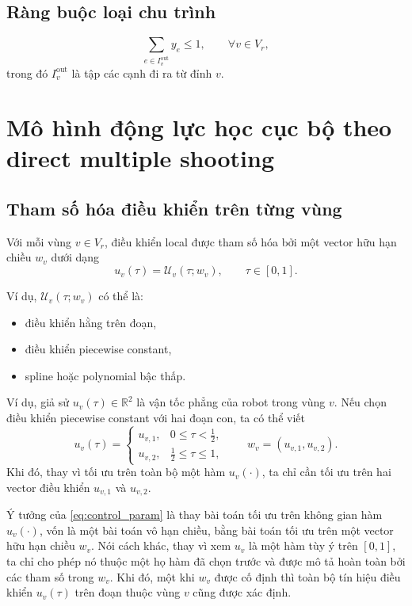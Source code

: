 \documentclass[12pt]{article}
\begin{document}
\subsection{Ràng buộc loại chu trình}

\begin{equation}
\sum_{e\in I_v^{\mathrm{out}}} y_e \le 1,
\qquad \forall v\in V_r,
\label{eq:acyclicity}
\end{equation}
trong đó $I_v^{\mathrm{out}}$ là tập các cạnh đi ra từ đỉnh $v$.

\section{Mô hình động lực học cục bộ theo direct multiple shooting}

\subsection{Tham số hóa điều khiển trên từng vùng}

Với mỗi vùng $v\in V_r$, điều khiển local được tham số hóa bởi một vector hữu hạn chiều $w_v$ dưới dạng
\begin{equation}
u_v(\tau)=\mathcal U_v(\tau;w_v),
\qquad \tau\in[0,1].
\label{eq:control_param}
\end{equation}

Ví dụ, $\mathcal U_v(\tau;w_v)$ có thể là:
\begin{itemize}
    \item điều khiển hằng trên đoạn,
    \item điều khiển piecewise constant,
    \item spline hoặc polynomial bậc thấp.
\end{itemize}

Ví dụ, giả sử $u_v(\tau)\in\mathbb R^2$ là vận tốc phẳng của robot trong vùng $v$. Nếu chọn điều khiển piecewise constant với hai đoạn con, ta có thể viết
\[
u_v(\tau)=
\begin{cases}
u_{v,1}, & 0\le \tau < \tfrac12,\\
u_{v,2}, & \tfrac12 \le \tau \le 1,
\end{cases}
\qquad
w_v=(u_{v,1},u_{v,2}).
\]
Khi đó, thay vì tối ưu trên toàn bộ một hàm $u_v(\cdot)$, ta chỉ cần tối ưu trên hai vector điều khiển $u_{v,1}$ và $u_{v,2}$.

Ý tưởng của \eqref{eq:control_param} là thay bài toán tối ưu trên không gian hàm $u_v(\cdot)$, vốn là một bài toán vô hạn chiều, bằng bài toán tối ưu trên một vector hữu hạn chiều $w_v$. Nói cách khác, thay vì xem $u_v$ là một hàm tùy ý trên $[0,1]$, ta chỉ cho phép nó thuộc một họ hàm đã chọn trước và được mô tả hoàn toàn bởi các tham số trong $w_v$. Khi đó, một khi $w_v$ được cố định thì toàn bộ tín hiệu điều khiển $u_v(\tau)$ trên đoạn thuộc vùng $v$ cũng được xác định.
\end{document}
